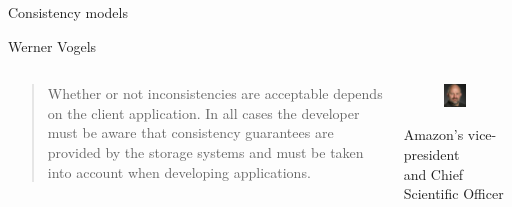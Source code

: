 \begin{frame}{Consistency models}

\begin{block}{Werner Vogels}

\begin{columns}
\begin{column}{0.59\textwidth}
\begin{quote}
Whether or not inconsistencies are acceptable depends on the client application. 
In all cases \alert{the developer must be aware} that consistency guarantees
are provided by the storage systems and must be taken into account when
developing applications.
\end{quote}

{\footnotesize
{}
}
\end{column}
\begin{column}{0.39\textwidth}
\begin{figure}
	\includegraphics[width=0.8\textwidth]{werner}
\end{figure}
Amazon's vice-president\\ and Chief Scientific Officer
\end{column}
\end{columns}

\end{block}


\end{frame}

